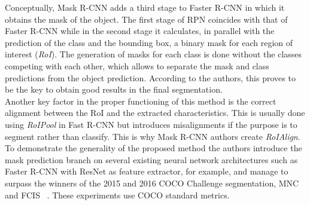 Conceptually, Mask R-CNN adds a third stage to Faster R-CNN in which it obtains the mask of the object. The first stage of RPN coincides with that of Faster R-CNN while in the second stage it calculates, in parallel with the prediction of the class and the bounding box, a binary mask for each region of interest (\textit{RoI}). The generation of masks for each class is done without the classes competing with each other, which allows to separate the mask and class predictions from the object prediction. According to the authors, this proves to be the key to obtain good results in the final segmentation.\\ 
Another key factor in the proper functioning of this method is the correct alignment between the RoI and the extracted characteristics. This is usually done using \textit{RoIPool} in Fast R-CNN but introduces misalignments if the purpose is to segment rather than classify. This is why Mask R-CNN authors create \textit{RoIAlign}. To demonstrate the generality of the proposed method the authors introduce the mask prediction branch on several existing neural network architectures such as Faster R-CNN with ResNet as feature extractor, for example, and manage to surpass the winners of the 2015 and 2016 COCO Challenge segmentation, MNC ~\cite{dai2016instance} and FCIS ~\cite{li2016fully}. These experiments use COCO standard metrics.\\
